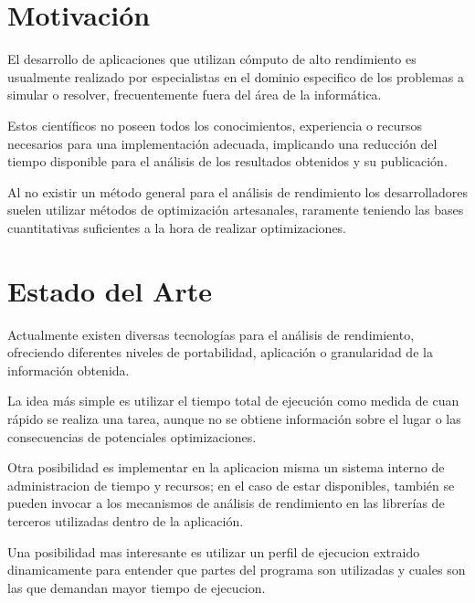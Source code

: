\documentclass[a4paper,twocolumn]{article}
\begin{document}
\section{Motivaci\'on}

El desarrollo de aplicaciones que utilizan c\'omputo de alto rendimiento es
usualmente realizado por especialistas en el dominio especifico de los problemas
a simular o resolver, frecuentemente fuera del \'area de la inform\'atica.

\smallskip

Estos cient\'ificos no poseen todos los conocimientos, experiencia o recursos
necesarios para una implementaci\'on adecuada, implicando una reducci\'on del
tiempo disponible para el an\'alisis de los resultados obtenidos y su publicaci\'on.

\smallskip

Al no existir un m\'etodo general para el an\'alisis de rendimiento los
desarrolladores suelen utilizar m\'etodos de optimizaci\'on artesanales, raramente
teniendo las bases cuantitativas suficientes a la hora de realizar optimizaciones.

\section{Estado del Arte}

Actualmente existen diversas tecnolog\'ias para el an\'alisis de rendimiento,
ofreciendo diferentes niveles de portabilidad, aplicaci\'on o granularidad de la
informaci\'on obtenida.

\smallskip

La idea m\'as simple es utilizar el tiempo total de ejecuci\'on como medida de cuan
r\'apido se realiza una tarea, aunque no se obtiene informaci\'on sobre el lugar o
las consecuencias de potenciales optimizaciones.

\smallskip

Otra posibilidad es implementar en la aplicacion misma un sistema interno de
administracion de tiempo y recursos; en el caso de estar disponibles, tambi\'en se
pueden invocar a los mecanismos de an\'alisis de rendimiento en las librer\'ias de
terceros utilizadas dentro de la aplicaci\'on.

\smallskip

Una posibilidad mas interesante es utilizar un perfil de ejecucion extraido
dinamicamente para entender que partes del programa son utilizadas y cuales son
las que demandan mayor tiempo de ejecucion.

\smallskip
\end{document}
